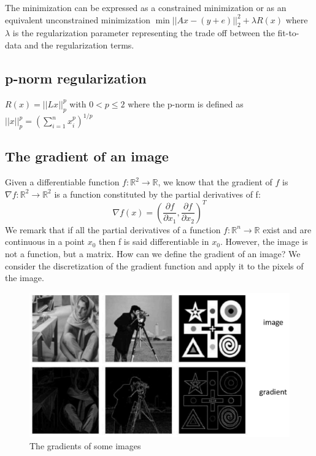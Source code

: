 \documentclass{article}
\begin{document}
The minimization can be expressed as a constrained minimization or as an equivalent unconstrained minimization $\min || Ax - (y+e)||^2_2 + \lambda R(x)$ where $\lambda$ is the regularization parameter representing the trade off between the fit-to-data and the regularization terms.

\subsection{p-norm regularization}

$R(x) = ||Lx||^p_p$ with $0<p\leq 2$ where the p-norm is defined as $||x||^p_p = (\sum_{i=1}^n x_i^p)^{1/p}$

\subsection{The gradient of an image}
Given a differentiable function $f:\mathbb{R}^2 \rightarrow \mathbb{R}$, we know that the gradient of $f$ is $\nabla f : \mathbb{R}^2 \rightarrow \mathbb{R}^2$ is a function constituted by the partial derivatives of f:
$$\nabla f(x) = (\frac{\partial f}{\partial x_1}, \frac{\partial f}{\partial x_2})^T$$
We remark that if all the partial derivatives of a function $f:\mathbb{R}^n \rightarrow \mathbb{R}$ exist and are continuous in a point $x_0$ then f is said differentiable in $x_0$.
However, the image is not a function, but a matrix. How can we define the gradient of an image?
We consider the discretization of the gradient function and apply it to the pixels of the image.

\begin{figure}[htbp]
  \centering
  \includegraphics[width=0.7\linewidth]{./img/image_gradient.jpg}
  \caption{The gradients of some images}
  \label{fig:image_gradient}
\end{figure}
\end{document}
